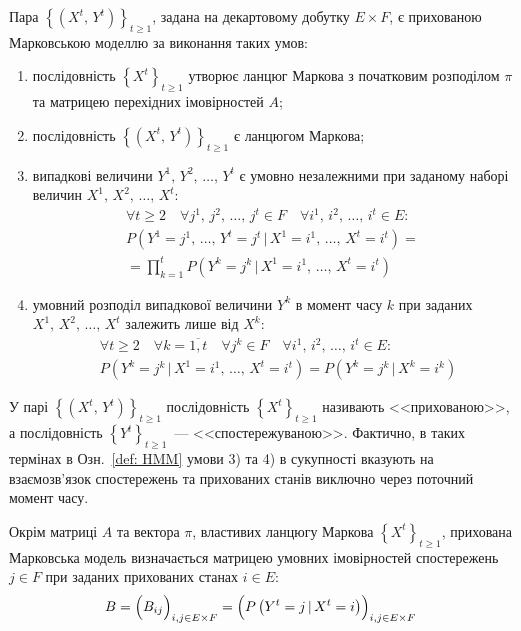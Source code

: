 \begin{definition}\label{def: HMM}
    Пара $\left\{\left( X^t,\,Y^t \right)\right\}_{t\geqslant 1}$, задана на декартовому добутку $E\times F$, є прихованою Марковською моделлю за виконання таких умов:
    \begin{enumerate}
        \item послідовність $\left\{ X^t \right\}_{t\geqslant 1}$ утворює ланцюг Маркова з початковим розподілом $\pi$ та матрицею перехідних імовірностей $A$;
        \item послідовність $\left\{\left( X^t,\,Y^t \right)\right\}_{t\geqslant 1}$ є ланцюгом Маркова;
        \item випадкові величини $Y^1,\,Y^2,\,\ldots,\,Y^t$ є умовно незалежними при заданому наборі величин $X^1,\,X^2,\,\ldots,\,X^t:$
        \begin{multline*}
            \forall t\geqslant 2 \quad \forall j^1,\,j^2,\,\ldots,\,j^t \in F \quad \forall i^1,\,i^2,\,\ldots,\,i^t \in E: \\
            P\left( Y^1=j^1,\,\ldots,\,Y^t=j^t \,|\, X^1=i^1,\,\ldots,\,X^t=i^t \right) = \\
            = \prod\limits_{k=1}^{t}P\left( Y^k=j^k \,|\, X^1=i^1,\,\ldots,\,X^t=i^t \right)
        \end{multline*}
        \item умовний розподіл випадкової величини $Y^k$ в момент часу $k$ при заданих $X^1,\,X^2,\,\ldots,\,X^t$ залежить лише від $X^k:$
        \begin{align*}
            & \forall t\geqslant 2 \quad \forall k=\overline{1,t} \quad \forall j^k \in F \quad \forall i^1,\,i^2,\,\ldots,\,i^t \in E: \\
            & P\left( Y^k=j^k \,|\, X^1=i^1,\,\ldots,\,X^t=i^t \right) = P\left( Y^k=j^k \,|\, X^k=i^k \right)
        \end{align*}
    \end{enumerate}
\end{definition}

У парі $\left\{\left( X^t,\,Y^t \right)\right\}_{t\geqslant 1}$ послідовність $\left\{ X^t \right\}_{t\geqslant 1}$ називають <<прихованою>>, а послідовність $\left\{ Y^t \right\}_{t\geqslant 1}$~--- <<спостережуваною>>. Фактично, в таких термінах в Озн.~\ref{def: HMM} умови 3) та 4) в сукупності вказують на взаємозв'язок спостережень та прихованих станів виключно через поточний момент часу.

Окрім матриці $A$ та вектора $\pi$, властивих ланцюгу Маркова $\left\{ X^t \right\}_{t\geqslant 1}$, прихована Марковська модель визначається матрицею умовних імовірностей спостережень $j \in F$ при заданих прихованих станах $i \in E:$
\begin{equation*}
    B = \Bigl( B_{ij} \Bigr)_{i,j \in E \times F} = \Bigl( P\left( Y^{t}=j \,|\, X^{t}=i \right) \Bigr)_{i,j \in E \times F}
\end{equation*} 

